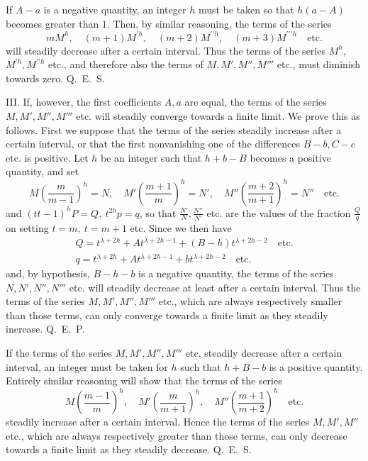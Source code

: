 If $A-a$ is a negative quantity, an integer $h$ must be taken so that $h(a-A)$ becomes greater than $1$. Then, by similar reasoning, the terms of the series
\[
mM^h,\quad (m+1)M^{\prime h},\quad (m+2)M^{\prime\prime h},\quad (m+3)M^{\prime\prime\prime h}\quad\mathrm{etc.}
\]
will steadily decrease after a certain interval. Thus the terms of the series $M^h$, $M^{\prime h},M^{\prime\prime h}$ etc., and therefore also the terms of $M,M',M'',M'''$ etc., must diminish towards zero. Q.~E.~S.

III. If, however, the first coefficients $A,a$ are equal, the terms of the series $M,\allowbreak M',\allowbreak M'',\allowbreak M'''$ etc. will steadily converge towards a finite limit. We prove this as follows. First we suppose that the terms of the series steadily increase after a certain interval, or that the first nonvanishing one of the differences $B-b,C-c$ etc.
is positive. Let $h$ be an integer such that $h+b-B$ becomes a positive quantity, and set
\[
M\left(\frac{m}{m-1}\right)^h=N,\quad
M'\left(\frac{m+1}{m}\right)^h=N',\quad
M''\left(\frac{m+2}{m+1}\right)^h=N''\quad\mathrm{etc.}
\]
and $(tt-1)^hP=Q,\ t^{2h}p=q$, so that $\frac{N'}{N},\frac{N''}{N'}$ etc. are the values of the fraction $\frac{Q}{q}$ on setting $t=m,\ t=m+1$ etc. Since we then have
\[
\begin{array}{l}
Q=t^{\lambda+2h}+At^{\lambda+2h-1}+(B-h)t^{\lambda+2h-2}\quad\mathrm{etc.}\\
q=t^{\lambda+2h}+At^{\lambda+2h-1}+bt^{\lambda+2h-2}\quad\mathrm{etc.}
\end{array}
\]
and, by hypothesis, $B-h-b$ is a negative quantity, the terms of the series $N,N',N'',N'''$ etc. will steadily decrease at least after a certain interval. Thus the terms of the series $M,M',M'',M'''$ etc., which are always respectively smaller than those terms, can only converge towards a finite limit as they steadily increase. Q.~E.~P.

If the terms of the series $M,M',M'',M'''$ etc. steadily decrease after a certain interval, an integer must be taken for $h$ such that $h+B-b$ is a positive quantity. Entirely similar reasoning will show that the terms of the series
\[
M\left(\frac{m-1}{m}\right)^h,\quad
M'\left(\frac{m}{m+1}\right)^h,\quad
M''\left(\frac{m+1}{m+2}\right)^h\quad\mathrm{etc.}
\]
steadily increase after a certain interval. Hence the terms of the series $M,M',M''$ etc., which are always respectively greater than those terms, can only decrease towards a finite limit as they steadily decrease. Q.~E.~S.

